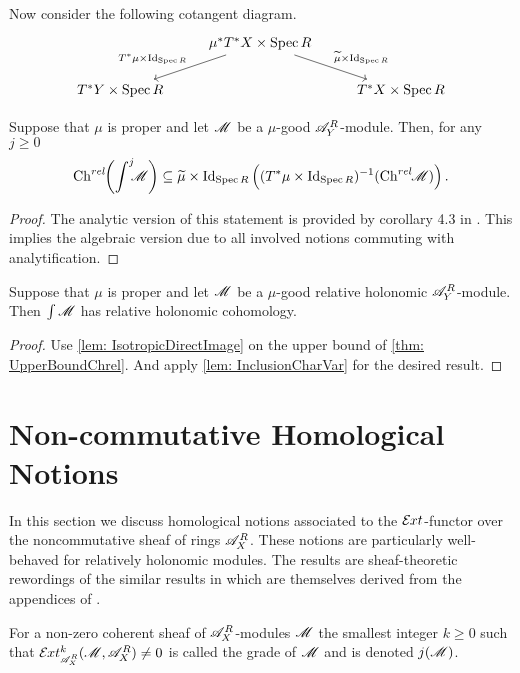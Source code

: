  Now consider the following cotangent diagram.
  $$
  \begin{tikzcd}
      & \mu^* T^* X\times \Spec R\arrow[swap]{ld}{T^* \mu \times \operatorname{Id}_{\Spec R}} \arrow{rd}{\widetilde{\mu}\times \operatorname{Id}_{\Spec R}} & \\
      T^* Y \times \Spec R& & T^*X\times \Spec R
  \end{tikzcd}
  $$
  \begin{theorem}\label{thm: UpperBoundChrel}
    Suppose that $\mu$ is proper and let $\mathscr{M}$ be a $\mu$-good $\mathscr{A}_Y^R$-module. Then, for any $j\geq 0$
    $$\operatorname{Ch}^{rel}\mkern-5mu\left(\int^j \mkern -8mu \mathscr{M} \right)\subseteq  \widetilde{\mu}\times \operatorname{Id}_{\operatorname{Spec} R}\left((T^*\mu \times \operatorname{Id}_{\operatorname{Spec} R})^{-1}(\operatorname{Ch}^{rel}\mkern-5mu \mathscr{M}) \right).$$
  \end{theorem}
  \begin{proof}
    The analytic version of this statement is provided by corollary 4.3 in \cite{schapira1994index}.
    This implies the algebraic version due to all involved notions commuting with analytification.
  \end{proof}
  \begin{theorem}\label{thm: RelHolConserved}
      Suppose that $\mu$ is proper and let $\mathscr{M}$ be a $\mu$-good relative holonomic $\mathscr{A}_Y^R$-module. Then $\int \mathscr{M}$ has relative holonomic cohomology.
  \end{theorem}
  \begin{proof}
    Use \cref{lem: IsotropicDirectImage} on the upper bound of \cref{thm: UpperBoundChrel}. And apply \cref{lem: InclusionCharVar} for the desired result.
  \end{proof}
\section{Non-commutative Homological Notions}\label{sec: NonComHomological}
In this section we discuss homological notions associated to the $\mathcal{E}\mkern -1mu xt$-functor over the noncommutative sheaf of rings $\mathscr{A}_X^R$.
These notions are particularly well-behaved for relatively holonomic modules.
The results are sheaf-theoretic rewordings of the similar results in \cite{budur2019zero} which are themselves derived from the appendices of \cite{bjork1993analytic}.
\begin{definition}
  For a non-zero coherent sheaf of $\mathscr{A}_X^R$-modules $\mathscr{M}$ the smallest integer $k\geq 0$ such that $\Ex{\A_X^R}{k}(\M,\A_X^R)\neq 0$ is called the grade of $\mathscr{M}$ and is denoted $j(\mathscr{M})$.
\end{definition}


